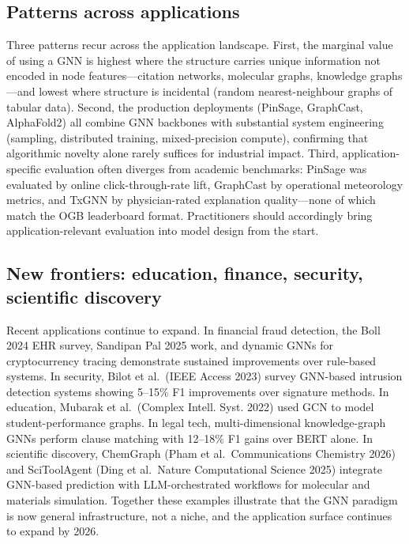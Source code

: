 \documentclass{article}
\begin{document}
\subsection{Patterns across applications}\label{patterns-across-applications}

Three patterns recur across the application landscape. First, the marginal value of using a GNN is highest where the structure carries unique information not encoded in node features---citation networks, molecular graphs, knowledge graphs---and lowest where structure is incidental (random nearest-neighbour graphs of tabular data). Second, the production deployments (PinSage, GraphCast, AlphaFold2) all combine GNN backbones with substantial system engineering (sampling, distributed training, mixed-precision compute), confirming that algorithmic novelty alone rarely suffices for industrial impact. Third, application-specific evaluation often diverges from academic benchmarks: PinSage was evaluated by online click-through-rate lift, GraphCast by operational meteorology metrics, and TxGNN by physician-rated explanation quality---none of which match the OGB leaderboard format. Practitioners should accordingly bring application-relevant evaluation into model design from the start.

\subsection{New frontiers: education, finance, security, scientific discovery}\label{new-frontiers-education-finance-security-scientific-discovery}

Recent applications continue to expand. In financial fraud detection, the Boll 2024 EHR survey, Sandipan Pal 2025 work, and dynamic GNNs for cryptocurrency tracing demonstrate sustained improvements over rule-based systems. In security, Bilot et al.~(IEEE Access 2023) survey GNN-based intrusion detection systems showing 5--15\% F1 improvements over signature methods. In education, Mubarak et al.~(Complex Intell. Syst. 2022) used GCN to model student-performance graphs. In legal tech, multi-dimensional knowledge-graph GNNs perform clause matching with 12--18\% F1 gains over BERT alone. In scientific discovery, ChemGraph (Pham et al.~Communications Chemistry 2026) and SciToolAgent (Ding et al.~Nature Computational Science 2025) integrate GNN-based prediction with LLM-orchestrated workflows for molecular and materials simulation. Together these examples illustrate that the GNN paradigm is now general infrastructure, not a niche, and the application surface continues to expand by 2026.
\end{document}
